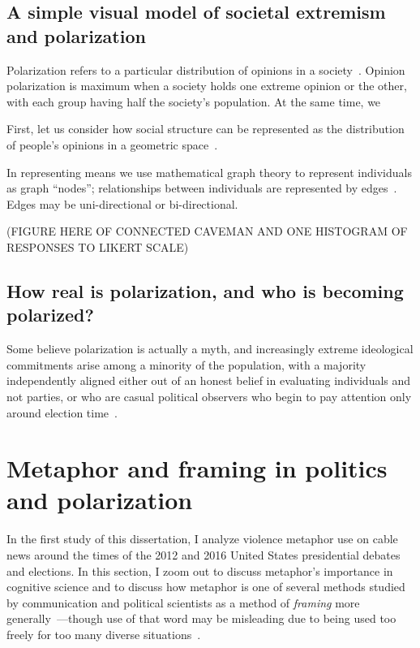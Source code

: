 \documentclass[12pt,letterpaper]{article}
\begin{document}
\subsection{A simple visual model of societal extremism and polarization}

Polarization refers to a particular distribution of opinions in a 
society~\cite{Blau1974,Bramson2016,Turner2018}. Opinion polarization is maximum when
a society holds one extreme opinion or the other, with each group having half
the society's population. At the same time, we 

First, let us consider how social structure can be represented as
the distribution of people's opinions in a geometric space~\cite{Blau1974}.

In representing  means we use mathematical graph theory to represent 
individuals as graph ``nodes''; relationships between individuals
are represented by edges~\cite{Friedkin1998,Barabasi2016}. 
Edges may be uni-directional or bi-directional.


(FIGURE HERE OF CONNECTED CAVEMAN AND ONE HISTOGRAM OF RESPONSES TO LIKERT SCALE)

\subsection{How real is polarization, and who is becoming polarized?}

Some believe polarization is actually a myth, and increasingly 
extreme ideological commitments arise among a minority of the population,
with a majority independently aligned either out of an honest belief in 
evaluating individuals and not parties, or who are casual political
observers who begin to pay attention only around election time~\cite{Kinder2017}.

\section{Metaphor and framing in politics and polarization}

In the first study of this dissertation, I analyze violence metaphor use on
cable news around the times of the 2012 and 2016 United States presidential
debates and elections. In this section, I zoom out to discuss metaphor's
importance in cognitive science and to discuss how metaphor is one of several
methods studied by communication and political scientists as a method of
\emph{framing} more generally~\cite{Fillmore1982}---though use of that 
word may be misleading due to being used too freely for too many 
diverse situations~\cite{Cacciatore2016}.
\end{document}
